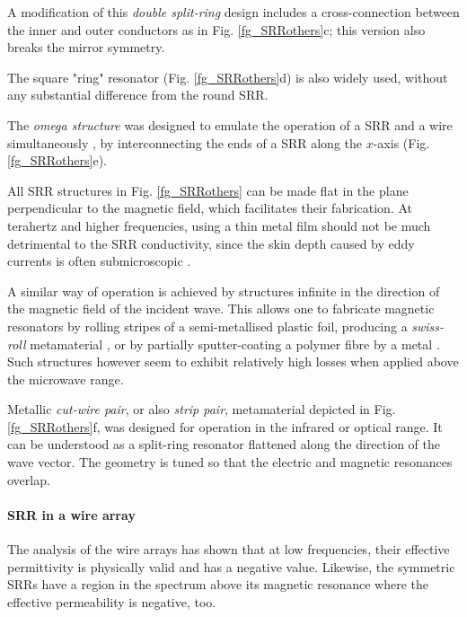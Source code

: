 A modification of this \textit{double split-ring} design includes a cross-connection between the inner and outer conductors as in Fig. \ref{fg_SRRothers}c; this version also breaks the mirror symmetry. 

The square "ring" resonator (Fig. \ref{fg_SRRothers}d) is also widely used, without any substantial difference from the round SRR.

The \textit{omega structure} was designed to emulate the operation of a SRR and a wire simultaneously \cite[pp. 62--72]{croenne2009controle}, by interconnecting the ends of a SRR along the $x$-axis (Fig. \ref{fg_SRRothers}e).

All SRR structures in Fig. \ref{fg_SRRothers} can be made flat in the plane perpendicular to the magnetic field, which facilitates their fabrication. At terahertz and higher frequencies, using a thin metal film should not be much detrimental to the SRR conductivity, since the skin depth caused by eddy currents is often submicroscopic \cite{gibbons2010scalable}.

A similar way of operation is achieved by structures infinite in the direction of the magnetic field of the incident wave. This allows one to fabricate magnetic resonators by rolling stripes of a semi-metallised plastic foil, producing a \textit{swiss-roll} metamaterial \cite{gibbons2010scalable}, or by partially sputter-coating a polymer fibre by a metal \cite{wang2011fiber}. Such structures however seem to exhibit relatively high losses when applied above the microwave range.

Metallic \textit{cut-wire pair}, or also \textit{strip pair}, metamaterial depicted in Fig. \ref{fg_SRRothers}f, was designed for operation in the infrared or optical range. It can be understood as a split-ring resonator flattened along the direction of the wave vector. The geometry is tuned so that the electric and magnetic resonances overlap.	

\paragraph{SRR in a wire array} %
The analysis of the wire arrays has shown that at low frequencies, their effective permittivity is physically valid and has a negative value. Likewise, the symmetric SRRs have a region in the spectrum above its magnetic resonance where the effective permeability is negative, too.

